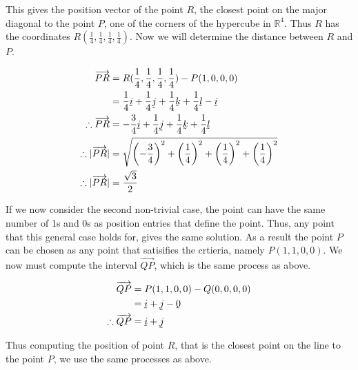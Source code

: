\documentclass[a4paper]{article}
\begin{document}
\begin{enumerate}[label=\textbf{\arabic*.}]
\begin{enumerate}
		This gives the position vector of the point $R$, the closest point on the major diagonal to the point $P$, one of the corners of the hypercube in $\mathbb{R}^4$. Thus $R$ has the coordinates $R(\frac{1}{4},\frac{1}{4},\frac{1}{4},\frac{1}{4})$. Now we will determine the distance between $R$ and $P$.

		\begin{align*}
		\overrightarrow{PR} & = R(\frac{1}{4},\frac{1}{4},\frac{1}{4},\frac{1}{4}) - P(1,0,0,0)\\
		& = \frac{1}{4}\underaccent{\tilde}{i} + \frac{1}{4}\underaccent{\tilde}{j} + \frac{1}{4}\underaccent{\tilde}{k} + \frac{1}{4}\underaccent{\tilde}{l} - \underaccent{\tilde}{i}\\
		\therefore \overrightarrow{PR} & = -\frac{3}{4}\underaccent{\tilde}{i} + \frac{1}{4}\underaccent{\tilde}{j} + \frac{1}{4}\underaccent{\tilde}{k} + \frac{1}{4}\underaccent{\tilde}{l}\\
		\therefore |\overrightarrow{PR}| & = \sqrt{\left(-\frac{3}{4}\right)^2 + \left(\frac{1}{4}\right)^2 + \left(\frac{1}{4}\right)^2 + \left(\frac{1}{4}\right)^2}\\
		\therefore |\overrightarrow{PR}| & = \frac{\sqrt{3}}{2}\\
		\end{align*}

		If we now consider the second non-trivial case, the point can have the same number of 1s and 0s as position entries that define the point. Thus, any point that this general case holds for, gives the same solution. As a result the point $P$ can be chosen as any point that satisifies the crtieria, namely $P(1,1,0,0)$. We now must compute the interval $\overrightarrow{QP}$, which is the same process as above.

		\begin{align*}
		\overrightarrow{QP} & = P(1,1,0,0) - Q(0,0,0,0)\\
		& = \underaccent{\tilde}{i} + \underaccent{\tilde}{j} - \underaccent{\tilde}{0}\\
		\therefore \overrightarrow{QP} & = \underaccent{\tilde}{i} + \underaccent{\tilde}{j}\\
		\end{align*}

		Thus computing the position of point $R$, that is the closest point on the line to the point $P$, we use the same processes as above.


\end{enumerate}
\end{enumerate}
\end{document}

